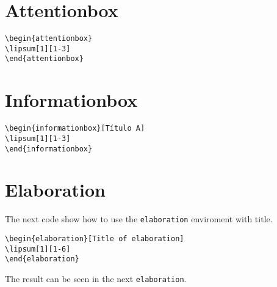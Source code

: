 \section{Attentionbox}

\lipsum[1][1-3]
\begin{highlightbox}
\begin{verbatim}
\begin{attentionbox}
\lipsum[1][1-3] 
\end{attentionbox}
\end{verbatim}
\end{highlightbox}
\begin{attentionbox}
\lipsum[1][1-3] 
\end{attentionbox}



\section{Informationbox}

\lipsum[1][1-3]
\begin{highlightbox}
\begin{verbatim}
\begin{informationbox}[Título A]
\lipsum[1][1-3]
\end{informationbox}
\end{verbatim}
\end{highlightbox}
\begin{informationbox}[Título A]
\lipsum[1][1-3]
\end{informationbox}


\section{Elaboration}

The next code show how to use the \texttt{elaboration} enviroment with title.
\begin{highlightbox}
\begin{verbatim}
\begin{elaboration}[Title of elaboration]
\lipsum[1][1-6]
\end{elaboration}
\end{verbatim}
\end{highlightbox}
The result can be seen in the next \texttt{elaboration}.
\begin{elaboration}
\lipsum[1][1-6]
\end{elaboration}

